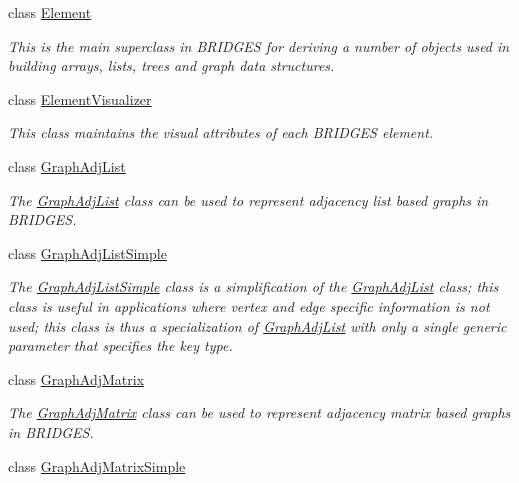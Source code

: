\begin{DoxyCompactItemize}
class \mbox{\hyperlink{classbridges_1_1base_1_1_element}{Element}}
\begin{DoxyCompactList}\small\item\em This is the main superclass in B\+R\+I\+D\+G\+ES for deriving a number of objects used in building arrays, lists, trees and graph data structures. \end{DoxyCompactList}\item 
class \mbox{\hyperlink{classbridges_1_1base_1_1_element_visualizer}{Element\+Visualizer}}
\begin{DoxyCompactList}\small\item\em This class maintains the visual attributes of each B\+R\+I\+D\+G\+ES element. \end{DoxyCompactList}\item 
class \mbox{\hyperlink{classbridges_1_1base_1_1_graph_adj_list}{Graph\+Adj\+List}}
\begin{DoxyCompactList}\small\item\em The \mbox{\hyperlink{classbridges_1_1base_1_1_graph_adj_list}{Graph\+Adj\+List}} class can be used to represent adjacency list based graphs in B\+R\+I\+D\+G\+ES. \end{DoxyCompactList}\item 
class \mbox{\hyperlink{classbridges_1_1base_1_1_graph_adj_list_simple}{Graph\+Adj\+List\+Simple}}
\begin{DoxyCompactList}\small\item\em The \mbox{\hyperlink{classbridges_1_1base_1_1_graph_adj_list_simple}{Graph\+Adj\+List\+Simple}} class is a simplification of the \mbox{\hyperlink{classbridges_1_1base_1_1_graph_adj_list}{Graph\+Adj\+List}} class; this class is useful in applications where vertex and edge specific information is not used; this class is thus a specialization of \mbox{\hyperlink{classbridges_1_1base_1_1_graph_adj_list}{Graph\+Adj\+List}} with only a single generic parameter that specifies the key type. \end{DoxyCompactList}\item 
class \mbox{\hyperlink{classbridges_1_1base_1_1_graph_adj_matrix}{Graph\+Adj\+Matrix}}
\begin{DoxyCompactList}\small\item\em The \mbox{\hyperlink{classbridges_1_1base_1_1_graph_adj_matrix}{Graph\+Adj\+Matrix}} class can be used to represent adjacency matrix based graphs in B\+R\+I\+D\+G\+ES. \end{DoxyCompactList}\item 
class \mbox{\hyperlink{classbridges_1_1base_1_1_graph_adj_matrix_simple}{Graph\+Adj\+Matrix\+Simple}}

\end{DoxyCompactItemize}
